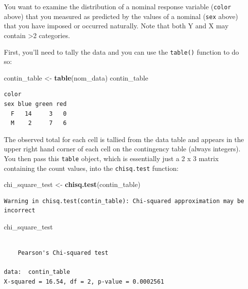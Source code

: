 \documentclass[twoside, 12pt]{article}
\newenvironment{Shaded}{\begin{snugshade}}{\end{snugshade}}
\newcommand{\KeywordTok}[1]{\textcolor[rgb]{0.13,0.29,0.53}{\textbf{{#1}}}}
\newcommand{\StringTok}[1]{\textcolor[rgb]{0.31,0.60,0.02}{{#1}}}
\newcommand{\NormalTok}[1]{{#1}}
\begin{document}
You want to examine the distribution of a nominal response variable
(\texttt{color} above) that you measured as predicted by the values of a
nominal (\texttt{sex} above) that you have imposed or occurred
naturally. Note that both Y and X may contain \textgreater{}2
categories.

First, you'll need to tally the data and you can use the
\texttt{table()} function to do so:

\begin{Shaded}
\begin{Highlighting}[]
\NormalTok{contin_table <-}\StringTok{ }\KeywordTok{table}\NormalTok{(nom_data)}
\NormalTok{contin_table}
\end{Highlighting}
\end{Shaded}

\begin{Verbatim}[frame=single]
   color
sex blue green red
  F   14     3   0
  M    2     7   6
\end{Verbatim}

The observed total for each cell is tallied from the data table and
appears in the upper right hand corner of each cell on the contingency
table (always integers). You then pass this \texttt{table} object, which
is essentially just a 2 x 3 matrix containing the count values, into the
\texttt{chisq.test} function:

\begin{Shaded}
\begin{Highlighting}[]
\NormalTok{chi_square_test <-}\StringTok{ }\KeywordTok{chisq.test}\NormalTok{(contin_table)}
\end{Highlighting}
\end{Shaded}

\begin{Verbatim}[frame=single, formatcom=\color{red}]
Warning in chisq.test(contin_table): Chi-squared approximation may be
incorrect
\end{Verbatim}

\begin{Shaded}
\begin{Highlighting}[]
\NormalTok{chi_square_test}
\end{Highlighting}
\end{Shaded}

\begin{Verbatim}[frame=single]

    Pearson's Chi-squared test

data:  contin_table
X-squared = 16.54, df = 2, p-value = 0.0002561
\end{Verbatim}
\end{document}

